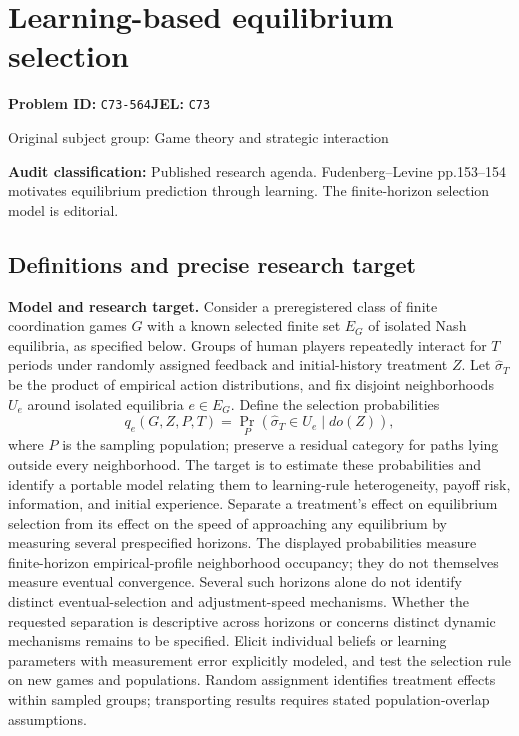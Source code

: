 \documentclass[11pt,a4paper]{article}
\begin{document}
\section*{Learning-based equilibrium selection}
\textbf{Problem ID:} \texttt{C73-564}\quad \textbf{JEL:} \texttt{C73}\par
\label{problem:OP-0281}
{\sffamily\small\color{muted}Original subject group: Game theory and strategic interaction\par}
\label{definitions:problem:30007563}
\textbf{Audit classification:} Published research agenda. Fudenberg–Levine pp.153–154 motivates equilibrium prediction through learning. The finite-horizon selection model is editorial.
\subsection*{Definitions and precise research target}
\textbf{Model and research target.} Consider a preregistered class of finite coordination games \(G\) with a known selected finite set \(E_G\) of isolated Nash equilibria, as specified below. Groups of human players repeatedly interact for \(T\) periods under randomly assigned feedback and initial-history treatment \(Z\). Let \(\widehat\sigma_T\) be the product of empirical action distributions, and fix disjoint neighborhoods \(U_e\) around isolated equilibria \(e\in E_G\). Define the selection probabilities
\[
 q_e(G,Z,P,T)=\Pr_P(\widehat\sigma_T\in U_e\mid do(Z)),
\]
where \(P\) is the sampling population; preserve a residual category for paths lying outside every neighborhood. The target is to estimate these probabilities and identify a portable model relating them to learning-rule heterogeneity, payoff risk, information, and initial experience. Separate a treatment's effect on equilibrium selection from its effect on the speed of approaching any equilibrium by measuring several prespecified horizons. The displayed probabilities measure finite-horizon empirical-profile neighborhood occupancy; they do not themselves measure eventual convergence. Several such horizons alone do not identify distinct eventual-selection and adjustment-speed mechanisms. Whether the requested separation is descriptive across horizons or concerns distinct dynamic mechanisms remains to be specified. Elicit individual beliefs or learning parameters with measurement error explicitly modeled, and test the selection rule on new games and populations. Random assignment identifies treatment effects within sampled groups; transporting results requires stated population-overlap assumptions.
\end{document}
